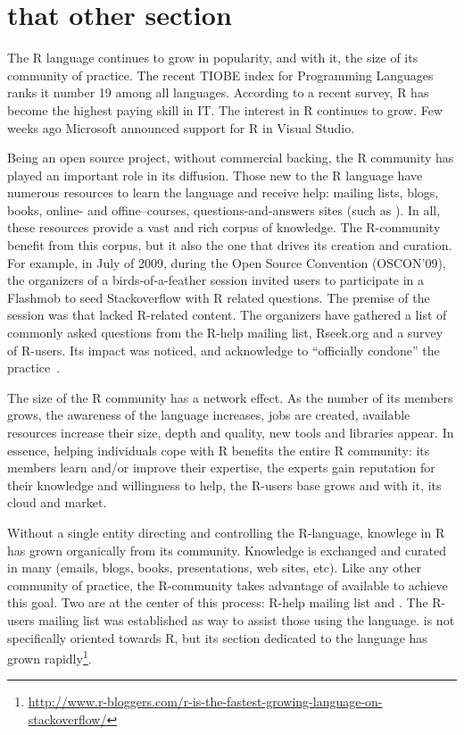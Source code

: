 \section{that other section}

The R language continues to grow in popularity, and with it, the size of its community of practice. The recent TIOBE index for Programming Languages ranks it
number 19 among all languages.  According to a recent survey, R has become the highest paying skill in IT. The interest in R continues to grow. Few weeks ago
Microsoft announced support for R in Visual Studio\cite{r-microsot}.

Being an open source project, without commercial backing, the R community has played an important role in its diffusion. Those new to the R language have
numerous resources to learn the language and receive help: mailing lists, blogs, books, online- and offine--courses, questions-and-answers sites (such as
\SO). In all, these resources provide a vast and rich corpus of knowledge. The R-community benefit from this corpus, but it also the one that drives its
creation and curation.  For example, in July of 2009, during the Open Source Convention (OSCON'09), the organizers of a birds-of-a-feather session invited users
to participate in a Flashmob to seed Stackoverflow with R related questions\cite{rflashmob09}. The premise of the session was that \SO lacked R-related
content. The organizers have gathered a list of commonly asked questions from the R-help mailing list, Rseek.org and a survey of R-users. Its impact was
noticed, and \SO acknowledge to ``officially condone'' the practice~\cite{soFlashmob09}.

The size of the R community has a network effect. As the number of its members grows, the awareness of the language increases, jobs are created, available
resources increase their size, depth and quality, new tools and libraries appear. In essence, helping individuals cope with R benefits the entire R
community: its members learn and/or improve their expertise, the experts gain reputation for their knowledge and willingness to help, the R-users base grows and
with it, its cloud and market.

Without a single entity directing and controlling the R-language, knowlege in R has grown organically from its community. Knowledge is exchanged and curated in
many \channels (emails, blogs, books, presentations, web sites, etc). Like any other community of practice, the R-community takes advantage of available \channels
to achieve this goal.
Two \channels are at the center of this process: R-help mailing list and \SO. The R-users mailing list was established  as way to assist those using
the language. \SO is not specifically oriented towards R, but its section dedicated to the language has grown rapidly\footnote{\url{http://www.r-bloggers.com/r-is-the-fastest-growing-language-on-stackoverflow/}}.

